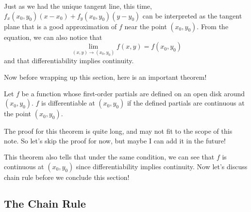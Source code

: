 \documentclass[../../../main.tex]{subfiles}
\begin{document}
Just as we had the unique tangent line, this time,
$f_x(x_0, y_0) (x - x_0) + f_y(x_0, y_0) (y - y_0)$ can be interpreted
as the tangent plane that is a good approximation of $f$ near the
point $(x_0, y_0)$. From the equation, we can also notice that
\[
\lim_{(x, y) \to (x_0, y_0)} f(x, y) = f(x_0, y_0)
\]
and that differentiability implies continuity.

Now before wrapping up this section, here is an important theorem!

\begin{theorem}{}{}
Let $f$ be a function whose first-order partials are defined on an
open disk around $(x_0, y_0)$. $f$ is differentiable at $(x_0, y_0)$
if the defined partials are continuous at the point $(x_0, y_0)$.
\end{theorem}

The proof for this theorem is quite long, and may not fit to the
scope of this note. So let's skip the proof for now, but maybe I
can add it in the future!

This theorem also tells that under the same condition, we can see
that $f$ is continuous at $(x_0, y_0)$ since differentiability implies
continuity. Now let's discuss chain rule before we conclude this
section!

\subsection{The Chain Rule}
\end{document}
